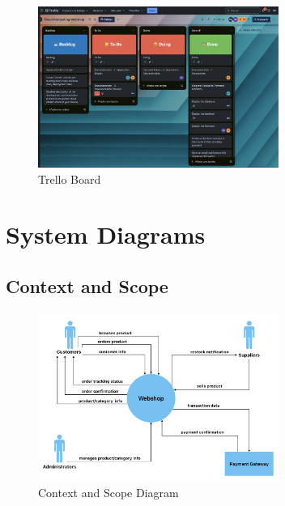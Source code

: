 \documentclass{llncs}
\begin{document}
\begin{figure}[htbp]
    \begin{center}
        \includegraphics[width=0.7\textwidth]{../diagrams/trello_board.png}
        \vspace{0.01\textwidth}
        \caption{Trello Board}
        \label{TrelloBoard} %
    \end{center}
\end{figure}
\section{System Diagrams}

\subsection{Context and Scope}
\begin{figure}[htbp]
    \begin{center}
        \includegraphics[width=0.7\textwidth]{../diagrams/contextview.png}
        \vspace{0.01\textwidth}
        \caption{Context and Scope Diagram}
        \label{ContextandScope} %
    \end{center}
\end{figure}
\end{document}
